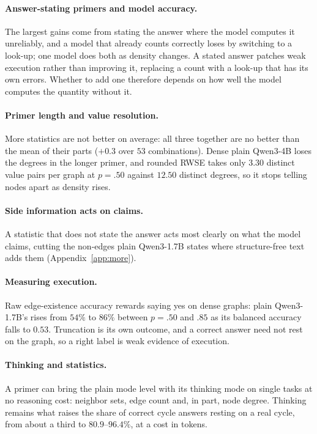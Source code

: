 \documentclass[11pt]{article}
\begin{document}
\paragraph{Answer-stating primers and model accuracy.} The largest gains come from stating the answer where the model computes it unreliably, and a model that already counts correctly loses by switching to a look-up; one model does both as density changes. A stated answer patches weak execution rather than improving it, replacing a count with a look-up that has its own errors. Whether to add one therefore depends on how well the model computes the quantity without it.

\paragraph{Primer length and value resolution.} More statistics are not better on average: all three together are no better than the mean of their parts ($+0.3$ over $53$ combinations). %
Dense plain Qwen3-4B loses the degrees in the longer primer, and rounded RWSE takes only $3.30$ distinct value pairs per graph at $p=.50$ against $12.50$ distinct degrees, so it stops telling nodes apart as density rises. %

\paragraph{Side information acts on claims.} A statistic that does not state the answer acts most clearly on what the model claims, cutting the non-edges plain Qwen3-1.7B states where structure-free text adds them (Appendix~\ref{app:more}).

\paragraph{Measuring execution.} Raw edge-existence accuracy rewards saying yes on dense graphs: plain Qwen3-1.7B's rises from $54\%$ to $86\%$ between $p=.50$ and $.85$ as its balanced accuracy falls to $0.53$. %
Truncation is its own outcome, and a correct answer need not rest on the graph, so a right label is weak evidence of execution.

\paragraph{Thinking and statistics.} A primer can bring the plain mode level with its thinking mode on single tasks at no reasoning cost: neighbor sets, edge count and, in part, node degree. Thinking remains what raises the share of correct cycle answers resting on a real cycle, from about a third to $80.9$--$96.4\%$, at a cost in tokens. %
\end{document}
